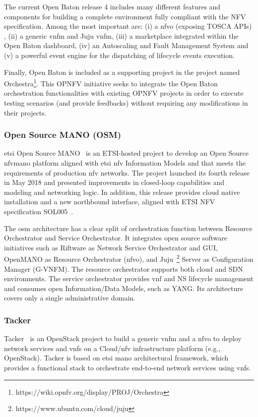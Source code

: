 The current Open Baton release 4 includes many different features and components for building a complete environment fully compliant with the NFV specification. Among the most important are: (i) a \gls{nfvo} (exposing TOSCA APIs) , (ii) a generic \gls{vnfm} and Juju \gls{vnfm}, (iii) a marketplace integrated within the Open Baton dashboard, (iv) an Autoscaling and Fault Management System and (v) a powerful event engine for the dispatching of lifecycle events execution.

Finally, Open Baton is included as a supporting project in the project named Orchestra\footnote{https://wiki.opnfv.org/display/PROJ/Orchestra}. This OPNFV initiative seeks to integrate the Open Baton orchestration functionalities with existing OPNFV projects in order to execute testing scenarios (and provide feedbacks) without requiring any modifications in their projects.

\subsubsection{Open Source MANO (OSM)}
\gls{etsi} Open Source MANO~\cite{ETSIOpenMANO} is an ETSI-hosted project to develop an Open Source \gls{nfvmano} platform aligned with \gls{etsi} \gls{nfv} Information Models and that meets the requirements of production \gls{nfv} networks. The project launched its fourth release~\cite{Israel2017OSMOverviewb} in May 2018 and presented improvements in closed‐loop capabilities and modeling and networking logic. In addition, this release provides cloud native installation and a new northbound interface, aligned with ETSI NFV specification SOL005~\cite{ ETSIIndustrySpecificationGroupISGNFV2018NetworkNFV}. 

The \gls{osm} architecture has a clear split of orchestration function between Resource Orchestrator and Service Orchestrator. It integrates open source software initiatives such as Riftware as Network Service Orchestrator and GUI, OpenMANO as Resource Orchestrator (\gls{nfvo}), and Juju~\footnote{https://www.ubuntu.com/cloud/juju} Server as Configuration Manager (G-VNFM). The resource orchestrator supports both cloud and SDN environments. The service orchestrator provides \gls{vnf} and NS lifecycle management and consumes open Information/Data Models, such as YANG. Its architecture covers only a single administrative domain.  

\subsubsection{Tacker}
Tacker~\cite{OpenStackFoundation2016} is an OpenStack project to build a generic \gls{vnfm} and a \gls{nfvo} to deploy network services and \glspl{vnf} on a Cloud/\gls{nfv} infrastructure platform (e.g., OpenStack). Tacker is based on \gls{etsi} \gls{mano} architectural framework, which provides a functional stack to orchestrate end-to-end network services using \glspl{vnf}.

